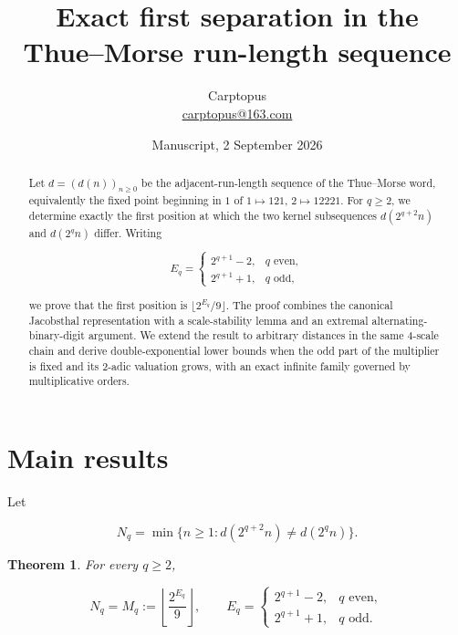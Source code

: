 \documentclass[11pt]{article}
\title{Exact first separation in the\\Thue--Morse run-length sequence}
\author{Carptopus\\\href{mailto:carptopus@163.com}{carptopus@163.com}}
\date{Manuscript, 2 September 2026}
\newtheorem{theorem}{Theorem}
\numberwithin{equation}{section}
\begin{document}
\maketitle

\begin{center}
\end{center}

\begin{abstract}


Let $d=(d(n))_{n\geq0}$ be the adjacent-run-length sequence of the Thue--Morse word, equivalently
the fixed point beginning in $1$ of $1\mapsto121$, $2\mapsto12221$. For $q\geq2$, we determine
exactly the first position at which the two kernel subsequences $d(2^{q+2}n)$ and $d(2^qn)$
differ. Writing

\[
E_q=\begin{cases}2^{q+1}-2,&q\text{ even},\\2^{q+1}+1,&q\text{ odd},\end{cases}
\]

we prove that the first position is $\lfloor2^{E_q}/9\rfloor$. The proof combines the canonical
Jacobsthal representation with a scale-stability lemma and an extremal alternating-binary-digit
argument. We extend the result to arbitrary distances in the same $4$-scale chain and derive
double-exponential lower bounds when the odd part of the multiplier is fixed and its 2-adic
valuation grows, with an exact infinite family governed by multiplicative orders.

\end{abstract}

\section{Main results}


Let

\[
N_q=\min\{n\geq1:d(2^{q+2}n)\neq d(2^qn)\}.
\]

\begin{theorem}


For every $q\geq2$,

\[
N_q=M_q:=\left\lfloor\frac{2^{E_q}}9\right\rfloor,
\qquad
E_q=\begin{cases}2^{q+1}-2,&q\text{ even},\\2^{q+1}+1,&q\text{ odd}.\end{cases}
\tag{1}
\]

\end{theorem}
\end{document}
